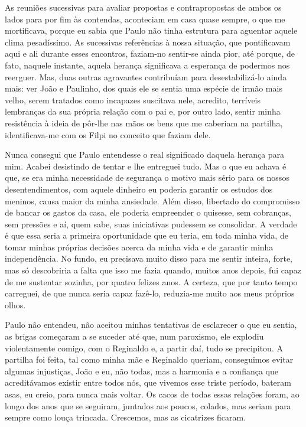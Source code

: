 As reuniões sucessivas para avaliar propostas e contrapropostas de ambos os lados para por fim às contendas, aconteciam em casa quase sempre, o que me mortificava, porque eu sabia que Paulo não tinha estrutura para aguentar aquele clima pesadíssimo.
As sucessivas referências à nossa situação, que pontificavam aqui e ali durante esses encontros, faziam-no sentir-se ainda pior, até porque, de fato, naquele instante, aquela herança significava a esperança de podermos nos reerguer.
Mas, duas outras agravantes contribuíam para desestabilizá-lo ainda mais: ver João e Paulinho, dos quais ele se sentia uma espécie de irmão mais velho, serem tratados como incapazes suscitava nele, acredito, terríveis lembranças da sua própria relação com o pai e, por outro lado, sentir minha resistência à ideia de pôr-lhe nas mãos os bens que me caberiam na partilha, identificava-me com os Filpi no conceito que faziam dele.

Nunca consegui que Paulo entendesse o real significado daquela herança para mim.
Acabei desistindo de tentar e lhe entreguei tudo.
Mas o que eu achava é que, se era minha necessidade de segurança o motivo mais sério para os nossos desentendimentos, com aquele dinheiro eu poderia garantir os estudos dos meninos, causa maior da minha ansiedade.
Além disso, libertado do compromisso de bancar os gastos da casa, ele poderia empreender o quisesse, sem cobranças, sem pressões e aí, quem sabe, suas iniciativas pudessem se consolidar.
A verdade é que essa seria a primeira oportunidade que eu teria, em toda minha vida, de tomar minhas próprias decisões acerca da minha vida e de garantir minha independência.
No fundo, eu precisava muito disso para me sentir inteira, forte, mas só descobriria a falta que isso me fazia quando, muitos anos depois, fui capaz de me sustentar sozinha, por quatro felizes anos.
A certeza, que por tanto tempo carreguei, de que nunca seria capaz fazê-lo, reduzia-me muito aos meus próprios olhos.

Paulo não entendeu, não aceitou minhas tentativas de esclarecer o que eu sentia, as brigas começaram a se suceder até que, num paroxismo, ele explodiu violentamente comigo, com o Reginaldo e, a partir daí, tudo se precipitou.
A partilha foi feita, tal como minha mãe e Reginaldo queriam, conseguimos evitar algumas injustiças, João e eu, não todas, mas a harmonia e a confiança que acreditávamos existir entre todos nós, que vivemos esse triste período, bateram asas, eu creio, para nunca mais voltar.
Os cacos de todas essas relações foram, ao longo dos anos que se seguiram, juntados aos poucos, colados, mas seriam para sempre como louça trincada.
Crescemos, mas as cicatrizes ficaram.

